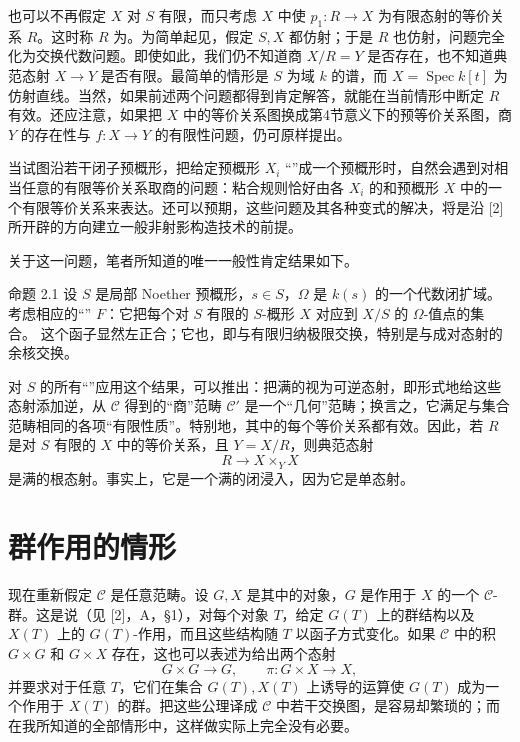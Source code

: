也可以不再假定 $X$ 对 $S$ 有限，而只考虑 $X$ 中使 $p_1:R\to X$ 为有限态射的等价关系 $R$。这时称 $R$ 为。为简单起见，假定 $S,X$ 都仿射；于是 $R$ 也仿射，问题完全化为交换代数问题。即使如此，我们仍不知道商 $X/R=Y$ 是否存在，也不知道典范态射 $X\to Y$ 是否有限。最简单的情形是 $S$ 为域 $k$ 的谱，而 $X=\operatorname{Spec}k[t]$ 为仿射直线。当然，如果前述两个问题都得到肯定解答，就能在当前情形中断定 $R$ 有效。还应注意，如果把 $X$ 中的等价关系图换成第4节意义下的预等价关系图，商 $Y$ 的存在性与 $f:X\to Y$ 的有限性问题，仍可原样提出。

当试图沿若干闭子预概形，把给定预概形 $X_i$ “”成一个预概形时，自然会遇到对相当任意的有限等价关系取商的问题：粘合规则恰好由各 $X_i$ 的和预概形 $X$ 中的一个有限等价关系来表达。还可以预期，这些问题及其各种变式的解决，将是沿 [2] 所开辟的方向建立一般非射影构造技术的前提。

关于这一问题，笔者所知道的唯一一般性肯定结果如下。

\begin{statement}{命题 2.1}
设 $S$ 是局部 Noether 预概形，$s\in S$，$\Omega$ 是 $k(s)$ 的一个代数闭扩域。考虑相应的“” $F$：它把每个对 $S$ 有限的 $S$-概形 $X$ 对应到 $X/S$ 的 $\Omega$-值点的集合。
这个函子显然左正合；它也，即与有限归纳极限交换，特别是与成对态射的余核交换。
\end{statement}

对 $S$ 的所有“”应用这个结果，可以推出：把满的视为可逆态射，即形式地给这些态射添加逆，从 $\mathcal C$ 得到的“商”范畴 $\mathcal C'$ 是一个“几何”范畴；换言之，它满足与集合范畴相同的各项“有限性质”。特别地，其中的每个等价关系都有效。因此，若 $R$ 是对 $S$ 有限的 $X$ 中的等价关系，且 $Y=X/R$，则典范态射
\[
 R\longrightarrow X\times_YX
\]
是满的根态射。事实上，它是一个满的闭浸入，因为它是单态射。

\section{群作用的情形}
现在重新假定 $\mathcal C$ 是任意范畴。设 $G,X$ 是其中的对象，$G$ 是作用于 $X$ 的一个 $\mathcal C$-群。这是说（见 [2]，A，\S1），对每个对象 $T$，给定 $G(T)$ 上的群结构以及 $X(T)$ 上的 $G(T)$-作用，而且这些结构随 $T$ 以函子方式变化。如果 $\mathcal C$ 中的积 $G\times G$ 和 $G\times X$ 存在，这也可以表述为给出两个态射
\[
 G\times G\longrightarrow G,
 \qquad \pi:G\times X\longrightarrow X,
\]
并要求对于任意 $T$，它们在集合 $G(T),X(T)$ 上诱导的运算使 $G(T)$ 成为一个作用于 $X(T)$ 的群。把这些公理译成 $\mathcal C$ 中若干交换图，是容易却繁琐的；而在我所知道的全部情形中，这样做实际上完全没有必要。

